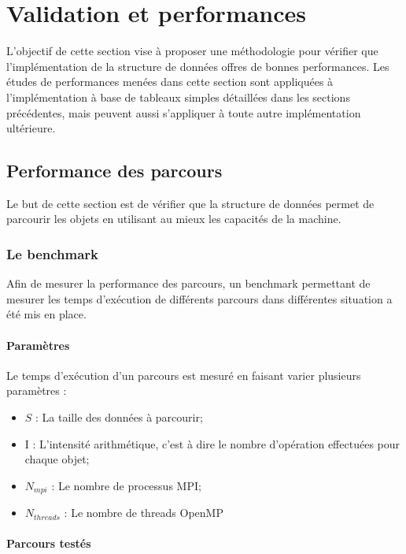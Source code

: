 \section{Validation et performances}

L'objectif de cette section vise à proposer une méthodologie pour vérifier que l'implémentation de la structure de données offres de bonnes performances. Les études de performances menées dans cette section sont appliquées à l'implémentation à base de tableaux simples détaillées dans les sections précédentes, mais peuvent aussi s'appliquer à toute autre implémentation ultérieure.

\subsection{Performance des parcours}

Le but de cette section est de vérifier que la structure de données permet de parcourir les objets en utilisant au mieux les capacités de la machine. 

\subsubsection{Le benchmark}

Afin de mesurer la performance des parcours, un benchmark permettant de mesurer les temps d'exécution de différents parcours dans différentes situation a été mis en place.

\paragraph{Paramètres}

Le temps d'exécution d'un parcours est mesuré en faisant varier plusieurs paramètres :
\begin{itemize}
	\item $S$ : La taille des données à parcourir;
	\item I : L'intensité arithmétique, c'est à dire le nombre d'opération effectuées pour chaque objet;
	\item $N_{mpi}$ : Le nombre de processus MPI;
	\item $N_{threads}$ : Le nombre de threads OpenMP
\end{itemize}

\paragraph{Parcours testés}

